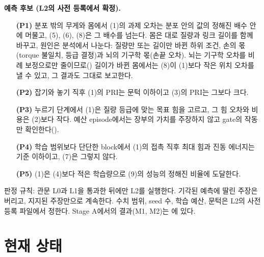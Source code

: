 \documentclass[11pt]{article}\usepackage[margin=1in]{geometry}\usepackage{amsmath,amssymb,amsthm,mathtools}\usepackage{graphicx}\graphicspath{{figures/}{../figures/}{figs/}{./}}\usepackage{enumitem}\usepackage{hyperref}\usepackage{cleveref}\usepackage{tikz}\usetikzlibrary{arrows.meta,positioning,calc,shapes.geometric}\usepackage{float}\usepackage{rotating}\usepackage[most]{tcolorbox}\usepackage{kotex}\usepackage{booktabs}\usepackage{longtable}\emergencystretch=1.6em\tolerance=2000 \crefname{assumption}{Assumption}{Assumptions}\Crefname{assumption}{Assumption}{Assumptions}\crefname{definition}{Definition}{Definitions}\Crefname{definition}{Definition}{Definitions}\crefname{proposition}{Proposition}{Propositions}\Crefname{proposition}{Proposition}{Propositions}\crefname{fact}{Fact}{Facts}\Crefname{fact}{Fact}{Facts} \newtheorem{assumption}{Assumption}\newtheorem{definition}{Definition}\newtheorem{lemma}{Lemma}\newtheorem{proposition}{Proposition}\newtheorem{theorem}{Theorem}\newtheorem{corollary}{Corollary}\newtheorem{fact}{Fact}\theoremstyle{remark}\newtheorem{remark}{Remark} \newcommand{\R}{\mathbb{R}}\newcommand{\xb}{\bar x}\newcommand{\Ab}{\bar A}\newcommand{\By}{\bar B_y}\newcommand{\U}{\mathcal U}\newcommand{\Z}{\mathcal Z}
\begin{document}
\textbf{예측 후보 (L2의 사전 등록에서 확정).}
\begin{itemize}
\item[\textbf{(P1)}] 분포 밖의 무게와 몸에서 (1)의 과제 오차는 분포 안의 값의 정해진 배수 안에 머물고, (5), (6), (8)은 그 배수를 넘는다. 몸은 대로 질량과 링크 길이를 함께 바꾸고, 원인은 분석에서 나눈다: 질량만 또는 길이만 바뀐 하위 조건, 손의 몫(torque 불일치, 등급 결정)과 뇌의 기구학 몫(손끝 오차). 뇌는 기구학 오차를 비례 보정으로만 줄이므로() 길이가 바뀐 몸에서는 (8)이 (1)보다 작은 위치 오차를 낼 수 있고, 그 결과도 그대로 보고한다.
\item[\textbf{(P2)}] 잡기와 놓기 직후 (1)의 PRI는 문턱 이하이고 (3)의 PRI는 그보다 크다.
\item[\textbf{(P3)}] 누르기 단계에서 (1)은 질량 등급에 맞는 목표 힘을 고르고, 그 힘 오차와 비용은 (2)보다 작다. 예산 episode에서는 장부의 가치를 주장하지 않고 gate의 작동만 확인한다().
\item[\textbf{(P4)}] 학습 범위보다 단단한 block에서 (1)의 접촉 직후 최대 힘과 진동 에너지는 기준 이하이고, (7)은 그렇지 않다.
\item[\textbf{(P5)}] (1)은 (4)보다 적은 학습량으로 (9)의 성능의 정해진 비율에 도달한다.
\end{itemize}
판정 규칙: 관문 L0과 L1을 통과한 뒤에만 L2를 실행한다. 기각된 예측에 딸린 주장은 버리고, 지지된 주장만으로 계속한다. 수치 범위, seed 수, 학습 예산, 문턱은 L2의 사전 등록 파일에서 정한다. Stage A에서의 결과(M1, M2)는 에 있다.

\section{현재 상태}
\label{sec:status3}
\end{document}
